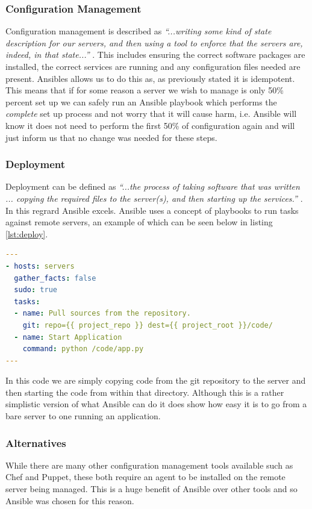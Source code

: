 \documentclass{article}
\begin{document}
\subsubsection{Configuration Management}
Configuration management is described as \textit{``...writing some kind of state description for our servers, and then using a tool to enforce that the servers are, indeed, in that state...''} \citep{Hochstein2015}. This includes ensuring the correct software packages are installed, the correct services are running and any configuration files needed are present. Ansibles allows us to do this as, as previously stated it is idempotent. This means that if for some reason a server we wish to manage is only 50\% percent set up we can safely run an Ansible playbook which performs the \textit{complete} set up process and not worry that it will cause harm, i.e. Ansible will know it does not need to perform the first 50\% of configuration again and will just inform us that no change was needed for these steps.

\subsubsection{Deployment}
Deployment can be defined as \textit{``...the process of taking software that was written ... copying the required files to the server(s), and then starting up the services.''} \citep{Hochstein2015}. In this regrard Ansible excels. Ansible uses a concept of playbooks to run tasks against remote servers, an example of which can be seen below in listing \ref{lst:deploy}.

\begin{lstlisting}[float,floatplacement=H,language=yaml,caption={A Simple Playbook To Deploy and Run Code},label={lst:deploy},basicstyle=\small]
---
- hosts: servers
  gather_facts: false
  sudo: true
  tasks:
  - name: Pull sources from the repository.
    git: repo={{ project_repo }} dest={{ project_root }}/code/
  - name: Start Application
    command: python /code/app.py
---
\end{lstlisting}

In this code we are simply copying code from the git repository to the server and then starting the code from within that directory. Although this is a rather simplistic version of what Ansible can do it does show how easy it is to go from a bare server to one running an application.


\subsubsection{Alternatives}
\label{subs:Ansible-alt}
While there are many other configuration management tools available such as Chef and Puppet, these both require an agent to be installed on the remote server being managed. This is a huge benefit of Ansible over other tools and so Ansible was chosen for this reason. 
\end{document}
